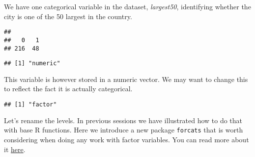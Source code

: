 \documentclass[
]{book}
\newenvironment{Shaded}{\begin{snugshade}}{\end{snugshade}}
\newcommand{\AttributeTok}[1]{\textcolor[rgb]{0.13,0.29,0.53}{#1}}
\newcommand{\FunctionTok}[1]{\textcolor[rgb]{0.13,0.29,0.53}{\textbf{#1}}}
\newcommand{\NormalTok}[1]{#1}
\newcommand{\OtherTok}[1]{\textcolor[rgb]{0.56,0.35,0.01}{#1}}
\newcommand{\SpecialCharTok}[1]{\textcolor[rgb]{0.81,0.36,0.00}{\textbf{#1}}}
\newcommand{\StringTok}[1]{\textcolor[rgb]{0.31,0.60,0.02}{#1}}
\begin{document}
We have one categorical variable in the dataset, \emph{largest50}, identifying whether the city is one of the 50 largest in the country.

\begin{Shaded}
\end{Shaded}

\begin{verbatim}
## 
##   0   1 
## 216  48
\end{verbatim}

\begin{Shaded}
\end{Shaded}

\begin{verbatim}
## [1] "numeric"
\end{verbatim}

This variable is however stored in a numeric vector. We may want to change this to reflect the fact it is actually categorical.

\begin{Shaded}
\end{Shaded}

\begin{verbatim}
## [1] "factor"
\end{verbatim}

Let's rename the levels. In previous sessions we have illustrated how to do that with base R functions. Here we introduce a new package \texttt{forcats} that is worth considering when doing any work with factor variables. You can read more about it \href{https://forcats.tidyverse.org}{here}.

\begin{Shaded}
\end{Shaded}
\end{document}
